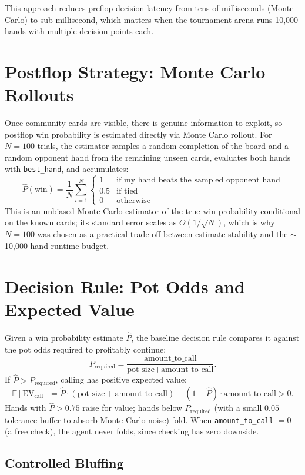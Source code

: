 \documentclass[11pt]{article}
\begin{document}
This approach reduces preflop decision latency from tens of milliseconds
(Monte Carlo) to sub-millisecond, which matters when the tournament arena
runs 10{,}000 hands with multiple decision points each.

\section{Postflop Strategy: Monte Carlo Rollouts}

Once community cards are visible, there is genuine information to exploit,
so postflop win probability is estimated directly via Monte Carlo rollout.
For $N=100$ trials, the estimator samples a random completion of the board
and a random opponent hand from the remaining unseen cards, evaluates both
hands with \texttt{best\_hand}, and accumulates:
\[
    \hat{P}(\text{win}) = \frac{1}{N}\sum_{i=1}^{N}
    \begin{cases}
        1 & \text{if my hand beats the sampled opponent hand} \\
        0.5 & \text{if tied} \\
        0 & \text{otherwise}
    \end{cases}
\]
This is an unbiased Monte Carlo estimator of the true win probability
conditional on the known cards; its standard error scales as
$O(1/\sqrt{N})$, which is why $N=100$ was chosen as a practical trade-off
between estimate stability and the $\sim$10{,}000-hand runtime budget.

\section{Decision Rule: Pot Odds and Expected Value}

Given a win probability estimate $\hat{P}$, the baseline decision rule
compares it against the pot odds required to profitably continue:
\[
    P_{\text{required}} = \frac{\text{amount\_to\_call}}{\text{pot\_size} + \text{amount\_to\_call}}.
\]
If $\hat{P} > P_{\text{required}}$, calling has positive expected value:
\[
    \mathbb{E}[\text{EV}_{\text{call}}] = \hat{P} \cdot (\text{pot\_size} + \text{amount\_to\_call}) - (1-\hat{P}) \cdot \text{amount\_to\_call} > 0.
\]
Hands with $\hat{P} > 0.75$ raise for value; hands below $P_{\text{required}}$
(with a small $0.05$ tolerance buffer to absorb Monte Carlo noise) fold.
When \texttt{amount\_to\_call} $= 0$ (a free check), the agent never folds,
since checking has zero downside.

\subsection{Controlled Bluffing}
\end{document}
